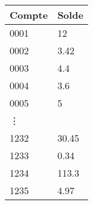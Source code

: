 \begin{table}[]
  \begin{tabularx}{\textwidth}{X|l}
    \toprule
    Compte & Solde \\ \midrule
    0001   & 12    \\
    0002   & 3.42  \\
    0003   & 4.4   \\
    0004   & 3.6   \\
    0005   & 5     \\
    \vdots &       \\
    1232   & 30.45 \\
    1233   & 0.34  \\
    1234   & 113.3 \\
    1235   & 4.97  \\ \bottomrule
  \end{tabularx}
\end{table}